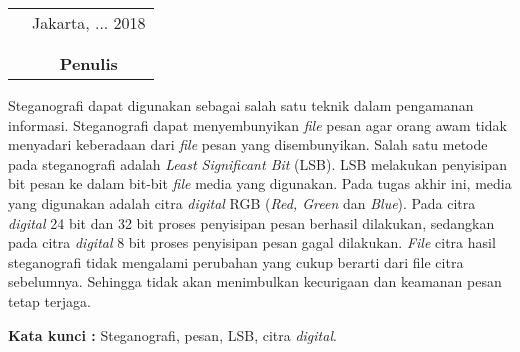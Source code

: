 \documentclass{jtetiskripsi}
\begin{document}
\vspace{.5cm}

\begin{tabular}{p{7.5cm}c}
	&Jakarta, ... 2018\\
	&\\
	&\\
	&\textbf{Penulis}
\end{tabular}


\tableofcontents 
{}
\listoffigures
{}
\listoftables
{}

\begin{abstractind}
	 Steganografi dapat digunakan sebagai salah satu teknik dalam pengamanan informasi. Steganografi dapat menyembunyikan \emph{file} pesan agar orang awam tidak menyadari keberadaan dari \emph{file} pesan yang disembunyikan. Salah satu metode pada steganografi adalah \emph{Least Significant Bit} (LSB). LSB melakukan penyisipan bit pesan ke dalam bit-bit \emph{file} media yang digunakan. Pada tugas akhir ini, media yang digunakan adalah citra \emph{digital} RGB (\emph{Red, Green} dan \emph{Blue}). Pada citra \emph{digital} 24 bit dan 32 bit proses penyisipan pesan berhasil dilakukan, sedangkan pada citra \emph{digital} 8 bit proses penyisipan pesan gagal dilakukan. \emph{File} citra hasil steganografi tidak
	 mengalami perubahan yang cukup berarti dari file citra sebelumnya. Sehingga tidak akan menimbulkan kecurigaan dan keamanan pesan tetap terjaga.
	
	\bigskip
	\noindent
	\textbf{Kata kunci :} Steganografi, pesan, LSB, citra \emph{digital}.
\end{abstractind}
\end{document}
